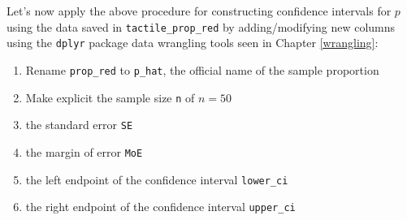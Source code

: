 \documentclass[12pt, krantz2,]{krantz}
\makeatletter
\newenvironment{Shaded}{\begin{snugshade}}{\end{snugshade}}
\newcommand{\DataTypeTok}[1]{\textcolor[rgb]{0.27,0.27,0.27}{#1}}
\newcommand{\DecValTok}[1]{\textcolor[rgb]{0.06,0.06,0.06}{#1}}
\newcommand{\FloatTok}[1]{\textcolor[rgb]{0.06,0.06,0.06}{#1}}
\newcommand{\KeywordTok}[1]{\textcolor[rgb]{0.27,0.27,0.27}{\textbf{#1}}}
\newcommand{\NormalTok}[1]{#1}
\newcommand{\OperatorTok}[1]{\textcolor[rgb]{0.43,0.43,0.43}{\textbf{#1}}}
\newcommand{\StringTok}[1]{\textcolor[rgb]{0.5,0.5,0.5}{#1}}
\providecommand{\tightlist}{%
  \setlength{\itemsep}{0pt}\setlength{\parskip}{0pt}}
\newenvironment{kframe}{%
\medskip{}
\setlength{\fboxsep}{.8em}
 \def\at@end@of@kframe{}%
 \ifinner\ifhmode%
  \def\at@end@of@kframe{\end{minipage}}%
  \begin{minipage}{\columnwidth}%
 \fi\fi%
 \def\FrameCommand##1{\hskip\@totalleftmargin \hskip-\fboxsep
 \colorbox{shadecolor}{##1}\hskip-\fboxsep
     \hskip-\linewidth \hskip-\@totalleftmargin \hskip\columnwidth}%
 \MakeFramed {\advance\hsize-\width
   \@totalleftmargin\z@ \linewidth\hsize
   \@setminipage}}%
 {\par\unskip\endMakeFramed%
 \at@end@of@kframe}
\renewenvironment{Shaded}{\begin{kframe}}{\end{kframe}}
\makeatother
\begin{document}
Let's now apply the above procedure for constructing confidence intervals for \(p\) using the data saved in \texttt{tactile\_prop\_red} by adding/modifying new columns using the \texttt{dplyr} package data wrangling tools seen in Chapter \ref{wrangling}:

\begin{enumerate}
\def\labelenumi{\arabic{enumi}.}
\tightlist
\item
  Rename \texttt{prop\_red} to \texttt{p\_hat}, the official name of the sample proportion
\item
  Make explicit the sample size \texttt{n} of \(n=50\)
\item
  the standard error \texttt{SE}
\item
  the margin of error \texttt{MoE}
\item
  the left endpoint of the confidence interval \texttt{lower\_ci}
\item
  the right endpoint of the confidence interval \texttt{upper\_ci}
\end{enumerate}

\begin{Shaded}
\end{Shaded}

\begingroup\fontsize{10}{12}\selectfont
\end{document}
